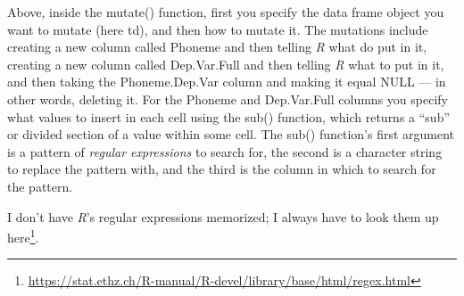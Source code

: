 \documentclass[
  12pt,
  letterpaper]{article}
\renewcommand\texttt[1]{{\ttfamily\color{BrickRed}#1}}
\DeclareRobustCommand{\href}[2]{#2\footnote{\url{#1}}}
\begin{document}
Above, inside the \texttt{mutate()} function, first you specify the data
frame object you want to mutate (here \texttt{td}), and then how to
mutate it. The mutations include creating a new column called
\texttt{Phoneme} and then telling \emph{R} what do put in it, creating a
new column called \texttt{Dep.Var.Full} and then telling \emph{R} what
to put in it, and then taking the \texttt{Phoneme.Dep.Var} column and
making it equal \texttt{NULL} --- in other words, deleting it. For the
\texttt{Phoneme} and \texttt{Dep.Var.Full} columns you specify what
values to insert in each cell using the \texttt{sub()} function, which
returns a ``sub'' or divided section of a value within some cell. The
\texttt{sub()} function's first argument is a pattern of \emph{regular
expressions} to search for, the second is a character string to replace
the pattern with, and the third is the column in which to search for the
pattern.

\begin{tcolorbox}[enhanced jigsaw, breakable, colframe=quarto-callout-note-color-frame, opacitybacktitle=0.6, colbacktitle=quarto-callout-note-color!10!white, leftrule=.75mm, coltitle=black, bottomrule=.15mm, bottomtitle=1mm, toprule=.15mm, left=2mm, title=\textcolor{quarto-callout-note-color}{\faInfo}\hspace{0.5em}{Note}, toptitle=1mm, opacityback=0, titlerule=0mm, arc=.35mm, rightrule=.15mm, colback=white]
I don't have \emph{R}'s regular expressions memorized; I always have to
look them up
\href{https://stat.ethz.ch/R-manual/R-devel/library/base/html/regex.html}{here}.
\end{tcolorbox}
\end{document}

